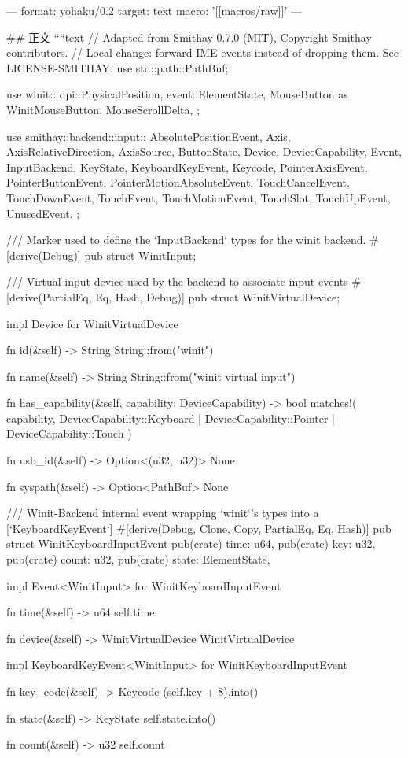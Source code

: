 ---
format: yohaku/0.2
target: text
macro: '[[macros/raw]]'
---

## 正文
````text
// Adapted from Smithay 0.7.0 (MIT), Copyright Smithay contributors.
// Local change: forward IME events instead of dropping them. See LICENSE-SMITHAY.
use std::path::PathBuf;

use winit::{
    dpi::PhysicalPosition,
    event::{ElementState, MouseButton as WinitMouseButton, MouseScrollDelta},
};

use smithay::backend::input::{
    AbsolutePositionEvent, Axis, AxisRelativeDirection, AxisSource, ButtonState, Device,
    DeviceCapability, Event, InputBackend, KeyState, KeyboardKeyEvent, Keycode, PointerAxisEvent,
    PointerButtonEvent, PointerMotionAbsoluteEvent, TouchCancelEvent, TouchDownEvent, TouchEvent,
    TouchMotionEvent, TouchSlot, TouchUpEvent, UnusedEvent,
};

/// Marker used to define the `InputBackend` types for the winit backend.
#[derive(Debug)]
pub struct WinitInput;

/// Virtual input device used by the backend to associate input events
#[derive(PartialEq, Eq, Hash, Debug)]
pub struct WinitVirtualDevice;

impl Device for WinitVirtualDevice {
    fn id(&self) -> String {
        String::from("winit")
    }

    fn name(&self) -> String {
        String::from("winit virtual input")
    }

    fn has_capability(&self, capability: DeviceCapability) -> bool {
        matches!(
            capability,
            DeviceCapability::Keyboard | DeviceCapability::Pointer | DeviceCapability::Touch
        )
    }

    fn usb_id(&self) -> Option<(u32, u32)> {
        None
    }

    fn syspath(&self) -> Option<PathBuf> {
        None
    }
}

/// Winit-Backend internal event wrapping `winit`'s types into a [`KeyboardKeyEvent`]
#[derive(Debug, Clone, Copy, PartialEq, Eq, Hash)]
pub struct WinitKeyboardInputEvent {
    pub(crate) time: u64,
    pub(crate) key: u32,
    pub(crate) count: u32,
    pub(crate) state: ElementState,
}

impl Event<WinitInput> for WinitKeyboardInputEvent {
    fn time(&self) -> u64 {
        self.time
    }

    fn device(&self) -> WinitVirtualDevice {
        WinitVirtualDevice
    }
}

impl KeyboardKeyEvent<WinitInput> for WinitKeyboardInputEvent {
    fn key_code(&self) -> Keycode {
        (self.key + 8).into()
    }

    fn state(&self) -> KeyState {
        self.state.into()
    }

    fn count(&self) -> u32 {
        self.count
    }
}

